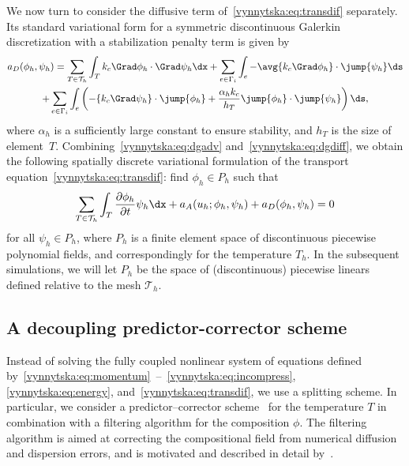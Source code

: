 We now turn to consider the diffusive term
of~\eqref{vynnytska:eq:transdif} separately. Its standard variational form
for a symmetric discontinuous Galerkin discretization with a stabilization
penalty term is given by~\citep{Arnold1982}
\begin{multline}
  \label{vynnytska:eq:dgdiff}
    a_D(\phi_h, \psi_h)
    =
    \sum_{T \in \mathcal{T}_h} \int_T k_c \Grad \phi_h \cdot \Grad \psi_h \dx
    + \sum_{e \in \Gamma_i }
    \int_{e} - \avg{k_c \Grad \phi_h} \cdot \jump{\psi_h} \ds
\\
    + \sum_{e \in \Gamma_i} \int_{e} \left(
    - \{ k_c \Grad \psi_h\} \cdot \jump{\phi_h}
    + \frac{\alpha_h k_c}{h_T} \jump{\phi_h} \cdot \jump{\psi_h}
    \right) \ds,
\end{multline}
where $\alpha_h$ is a sufficiently large constant to ensure stability, and
$h_T$ is the size of element~$T$. Combining~\eqref{vynnytska:eq:dgadv}
and~\eqref{vynnytska:eq:dgdiff}, we obtain the following
spatially discrete variational formulation of the transport
equation~\eqref{vynnytska:eq:transdif}: find $\phi_h \in P_h$ such that
\begin{equation}
  \label{vynnytska:eq:semi_composition}
  \sum_{T \in \mathcal{T}_h} \int_T \frac{\partial \phi_h}{\partial t}\psi_h \dx
  + a_{A} (u_h; \phi_h, \psi_h) + a_D(\phi_h, \psi_h) = 0
\end{equation}
for all $\psi_h \in P_h$, where $P_h$ is a finite element space of
discontinuous piecewise polynomial fields, and correspondingly for the
temperature $T_h$. In the subsequent simulations, we will let $P_h$ be
the space of (discontinuous) piecewise linears defined relative to the
mesh $\mathcal{T}_h$.

\subsection{A decoupling predictor-corrector scheme}

Instead of solving the fully coupled nonlinear system of equations
defined
by~\eqref{vynnytska:eq:momentum}~--~\eqref{vynnytska:eq:incompress},
\eqref{vynnytska:eq:energy}, and~\eqref{vynnytska:eq:transdif}, we
use a splitting scheme. In particular, we consider a
predictor--corrector scheme~\citep{BergKekenYuen1993, HansenEbel1988}
for the temperature $T$ in combination with a filtering algorithm for
the composition $\phi$. The filtering algorithm is aimed at correcting
the compositional field from numerical diffusion and dispersion
errors, and is motivated and described in detail
by~\citet{LenardicKaula1993}.

